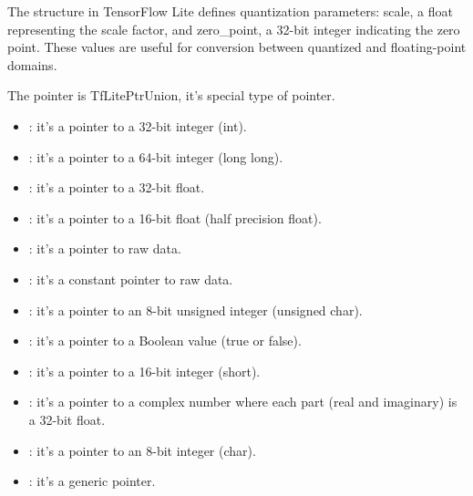 \begin{center}
    \label{Figure:Comatibily}
\end{center}


The structure  in TensorFlow Lite defines quantization parameters: scale, a float representing the scale factor, and zero\_point, a 32-bit integer indicating the zero point. These values are useful for conversion between quantized and floating-point domains.

\begin{center}
    \label{Figure:Comatibily}
\end{center}

The pointer is TfLitePtrUnion, it's special type of pointer. 

\begin{itemize}
    \item {}: it's a pointer to a 32-bit integer (int).
    \item {}: it's a pointer to a 64-bit integer (long long).
    \item {}: it's a pointer to a 32-bit float.
    \item {}: it's a  pointer to a 16-bit float (half precision float).
    \item {}: it's a pointer to raw data.
    \item {}: it's a constant pointer to raw data.
    \item {}: it's a pointer to an 8-bit unsigned integer (unsigned char).
    \item {}: it's a pointer to a Boolean value (true or false).
    \item {}: it's a pointer to a 16-bit integer (short).
    \item {}: it's a  pointer to a complex number where each part (real and imaginary) is a 32-bit float.
    \item {}: it's a pointer to an 8-bit integer (char).
    \item {}: it's a generic pointer. 	
\end{itemize} 

